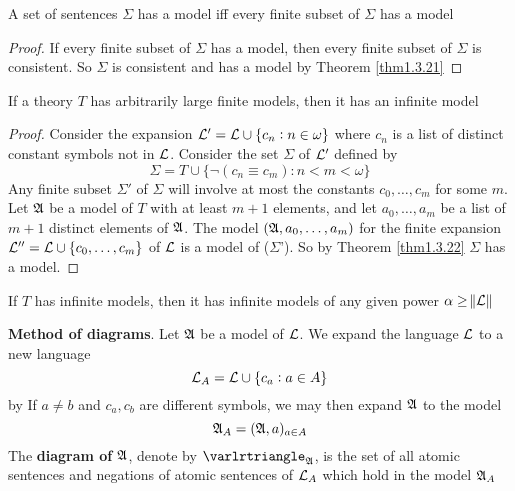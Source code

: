 \documentclass[11pt]{article}
\begin{document}
\begin{theorem}
\label{thm1.3.22}
A set of sentences \(\Sigma\) has a model iff every finite subset of \(\Sigma\) has a model
\end{theorem}

\begin{proof}
If every finite subset of \(\Sigma\) has a model, then every finite subset of \(\Sigma\) is
consistent. So \(\Sigma\) is consistent and has a model by Theorem \ref{thm1.3.21}
\end{proof}

\begin{corollary}[]
If a theory \(T\) has arbitrarily large finite models, then it has an
infinite model
\end{corollary}

\begin{proof}
Consider the expansion \(\mathcal{L}'=\mathcal{L}\cup\{c_n:n\in\omega\}\)  where \(c_n\)
is a list of distinct constant symbols not in \(\mathcal{L}\). Consider the set \(\Sigma\)
of \(\mathcal{L}'\) defined by
\begin{equation*}
\Sigma=T\cup\{\neg(c_n\equiv c_m):n<m<\omega\}
\end{equation*}
Any finite subset \(\Sigma'\) of \(\Sigma\) will involve at most the constants
\(c_0,\dots,c_m\) for some \(m\). Let \(\mathfrak{A}\) be  a model of \(T\) with at
least \(m+1\) elements, and let \(a_0,\dots,a_m\) be a list of \(m+1\)
distinct elements of \(\mathfrak{A}\). The model \((\mathfrak{A},a_0,\dots,a_m)\) for the
finite expansion \(\mathcal{L}''=\mathcal{L}\cup\{c_0,\dots,c_m\}\) of \(\mathcal{L}\) is a
model of (\(\Sigma\)'). So by Theorem \ref{thm1.3.22} \(\Sigma\) has a model.
\end{proof}

\begin{corollary}
If \(T\) has infinite models, then it has infinite models of any given power \(\alpha\ge\norm{\mathcal{L}}\)
\end{corollary}


\textbf{Method of diagrams}. Let \(\mathfrak{A}\) be a model of \(\mathcal{L}\). We expand the
language \(\mathcal{L}\) to a new language
\begin{equation*}
\mathcal{L}_A=\mathcal{L}\cup\{c_a:a\in A\}
\end{equation*}
by If \(a\neq b\) and \(c_a,c_b\) are different symbols, we may then expand
\(\mathfrak{A}\) to the model
\begin{equation*}
\mathfrak{A}_A=(\mathfrak{A},a)_{a\in A}
\end{equation*}
The \textbf{diagram of} \(\mathfrak{A}\), denote by \(\varlrtriangle_{\fA}\), is the set of all
atomic sentences and negations of atomic sentences of \(\mathcal{L}_A\) which hold
in the model \(\mathfrak{A}_A\)
\end{document}
